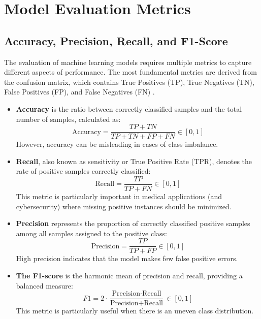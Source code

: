 \documentclass[12pt, a4paper]{report}
\begin{document}
\section{Model Evaluation Metrics}

\subsection{Accuracy, Precision, Recall, and F1-Score}
The evaluation of machine learning models requires multiple metrics to capture different aspects of performance. The most fundamental metrics are derived from the confusion matrix, which contains True Positives (TP), True Negatives (TN), False Positives (FP), and False Negatives (FN) .

\begin{itemize}
    \item \textbf{Accuracy} is the ratio between correctly classified samples and the total number of samples, calculated as:
    \begin{equation}
        \text{Accuracy} = \frac{TP + TN}{TP + TN + FP + FN} \in [0,1]
        \label{eq:accuracy}
    \end{equation}
    However, accuracy can be misleading in cases of class imbalance.

    \item \textbf{Recall}, also known as sensitivity or True Positive Rate (TPR), denotes the rate of positive samples correctly classified:
    \begin{equation}
        \text{Recall} = \frac{TP}{TP + FN} \in [0,1]
        \label{eq:recall}
    \end{equation}
    This metric is particularly important in medical applications (and cybersecurity) where missing positive instances should be minimized.

    \item \textbf{Precision} represents the proportion of correctly classified positive samples among all samples assigned to the positive class:
    \begin{equation}
        \text{Precision} = \frac{TP}{TP + FP} \in [0,1]
        \label{eq:precision}
    \end{equation}
    High precision indicates that the model makes few false positive errors.

    \item \textbf{The F1-score} is the harmonic mean of precision and recall, providing a balanced measure:
    \begin{equation}
        F1 = 2 \cdot \frac{\text{Precision} \cdot \text{Recall}}{\text{Precision} + \text{Recall}} \in [0,1]
        \label{eq:f1_score}
    \end{equation}
    This metric is particularly useful when there is an uneven class distribution.
\end{itemize}
\end{document}
